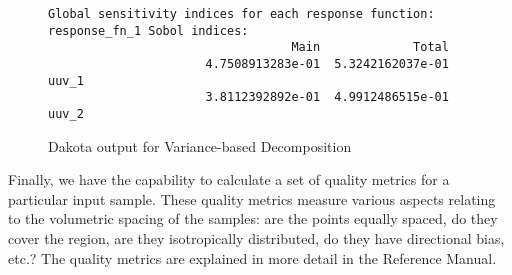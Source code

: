 \begin{figure}[ht!]
\centering
\begin{bigbox}
\begin{small}
\begin{verbatim}
Global sensitivity indices for each response function:
response_fn_1 Sobol indices:
                                  Main             Total
                      4.7508913283e-01  5.3242162037e-01 uuv_1
                      3.8112392892e-01  4.9912486515e-01 uuv_2
\end{verbatim}
\end{small}
\end{bigbox}
\caption{Dakota output for Variance-based Decomposition} 
\label{fig:dace:vbd}
\end{figure}

Finally, we have the capability to calculate a set of quality metrics 
for a particular input sample.  These quality metrics measure 
various aspects relating to the volumetric spacing of the samples: 
are the points equally spaced, do they cover the region, are they 
isotropically distributed, do they have directional bias, etc.? 
The quality metrics are explained in more detail in the Reference Manual.





